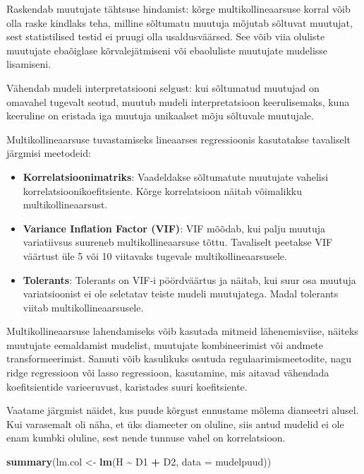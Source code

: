 \documentclass[
]{book}
\newenvironment{Shaded}{\begin{snugshade}}{\end{snugshade}}
\newcommand{\AttributeTok}[1]{\textcolor[rgb]{0.13,0.29,0.53}{#1}}
\newcommand{\FunctionTok}[1]{\textcolor[rgb]{0.13,0.29,0.53}{\textbf{#1}}}
\newcommand{\NormalTok}[1]{#1}
\newcommand{\OtherTok}[1]{\textcolor[rgb]{0.56,0.35,0.01}{#1}}
\newcommand{\SpecialCharTok}[1]{\textcolor[rgb]{0.81,0.36,0.00}{\textbf{#1}}}
\providecommand{\tightlist}{%
  \setlength{\itemsep}{0pt}\setlength{\parskip}{0pt}}
\renewenvironment{Shaded} {\begin{snugshade}\footnotesize} {\end{snugshade}}
\begin{document}
Raskendab muutujate tähtsuse hindamist: kõrge multikollineaarsuse korral võib olla raske kindlaks teha, milline sõltumatu muutuja mõjutab sõltuvat muutujat, sest statistilised testid ei pruugi olla usaldusväärsed. See võib viia oluliste muutujate ebaõiglase kõrvalejätmiseni või ebaoluliste muutujate mudelisse lisamiseni.

Vähendab mudeli interpretatsiooni selgust: kui sõltumatud muutujad on omavahel tugevalt seotud, muutub mudeli interpretatsioon keerulisemaks, kuna keeruline on eristada iga muutuja unikaalset mõju sõltuvale muutujale.

Multikollineaarsuse tuvastamiseks lineaarses regressioonis kasutatakse tavaliselt järgmisi meetodeid:

\begin{itemize}
\tightlist
\item
  \textbf{Korrelatsioonimatriks}: Vaadeldakse sõltumatute muutujate vahelisi korrelatsioonikoefitsiente. Kõrge korrelatsioon näitab võimalikku multikollineaarsust.
\item
  \textbf{Variance Inflation Factor (VIF)}: VIF mõõdab, kui palju muutuja variatiivsus suureneb multikollineaarsuse tõttu. Tavaliselt peetakse VIF väärtust üle 5 või 10 viitavaks tugevale multikollineaarsusele.
\item
  \textbf{Tolerants}: Tolerants on VIF-i pöördväärtus ja näitab, kui suur osa muutuja variatsioonist ei ole seletatav teiste mudeli muutujatega. Madal tolerants viitab multikollineaarsusele.
\end{itemize}

Multikollineaarsuse lahendamiseks võib kasutada mitmeid lähenemisviise, näiteks muutujate eemaldamist mudelist, muutujate kombineerimist või andmete transformeerimist. Samuti võib kasulikuks osutuda regulaarimismeetodite, nagu ridge regressioon või lasso regressioon, kasutamine, mis aitavad vähendada koefitsientide varieeruvust, karistades suuri koefitsiente.

Vaatame järgmist näidet, kus puude kõrgust ennustame mõlema diameetri alusel. Kui varasemalt oli näha, et üks diameeter on oluline, siis antud mudelid ei ole enam kumbki oluline, sest nende tunnuse vahel on korrelatsioon.

\begin{Shaded}
\begin{Highlighting}[]
\FunctionTok{summary}\NormalTok{(lm.col }\OtherTok{\textless{}{-}} \FunctionTok{lm}\NormalTok{(H }\SpecialCharTok{\textasciitilde{}}\NormalTok{ D1 }\SpecialCharTok{+}\NormalTok{ D2, }\AttributeTok{data =}\NormalTok{ mudelpuud))}
\end{Highlighting}
\end{Shaded}
\end{document}
